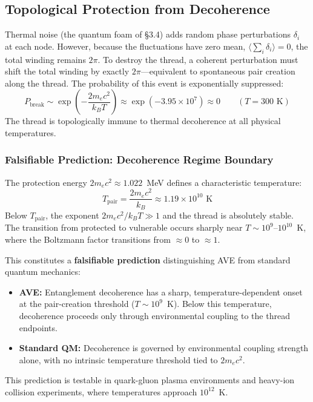 \subsection{Topological Protection from Decoherence}
\label{subsec:topo_protect}
Thermal noise (the quantum foam of \S3.4) adds random phase perturbations $\delta_i$ at each node. However, because the fluctuations have zero mean, $\langle \sum_i \delta_i \rangle = 0$, the total winding remains $2\pi$. To destroy the thread, a coherent perturbation must shift the total winding by exactly $2\pi$---equivalent to spontaneous pair creation along the thread. The probability of this event is exponentially suppressed:
\begin{equation}
    P_{\text{break}} \sim \exp\!\left(-\frac{2m_e c^2}{k_B T}\right) \approx \exp(-3.95 \times 10^7) \approx 0 \qquad (T = 300 \text{ K})
\end{equation}
The thread is topologically immune to thermal decoherence at all physical temperatures.

\subsubsection{Falsifiable Prediction: Decoherence Regime Boundary}
The protection energy $2m_e c^2 \approx 1.022$~MeV defines a characteristic temperature:
\begin{equation}
    T_{\text{pair}} = \frac{2m_e c^2}{k_B} \approx 1.19 \times 10^{10} \text{ K}
\end{equation}
Below $T_{\text{pair}}$, the exponent $2m_e c^2 / k_B T \gg 1$ and the thread is absolutely stable. The transition from protected to vulnerable occurs sharply near $T \sim 10^9$--$10^{10}$~K, where the Boltzmann factor transitions from $\approx 0$ to $\approx 1$.

This constitutes a \textbf{falsifiable prediction} distinguishing AVE from standard quantum mechanics:
\begin{itemize}
    \item \textbf{AVE:} Entanglement decoherence has a sharp, temperature-dependent onset at the pair-creation threshold ($T \sim 10^9$~K). Below this temperature, decoherence proceeds only through environmental coupling to the thread endpoints.
    \item \textbf{Standard QM:} Decoherence is governed by environmental coupling strength alone, with no intrinsic temperature threshold tied to $2m_e c^2$.
\end{itemize}
This prediction is testable in quark-gluon plasma environments and heavy-ion collision experiments, where temperatures approach $10^{12}$~K.

